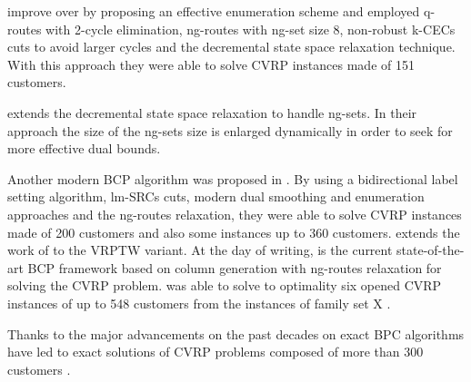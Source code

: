 \textcite{contardo2014} improve over \textcite{contardo2011}
by proposing an effective enumeration scheme and employed
q-routes with 2-cycle elimination, ng-routes with ng-set size 8,
non-robust k-CECs cuts to avoid larger cycles
and the decremental state space relaxation technique.
With this approach they were able to solve CVRP instances made of 151 customers.

\textcite{martinelli2014} extends the decremental state space relaxation
to handle ng-sets.
In their approach the size of the ng-sets size
is enlarged dynamically in order to seek for more effective dual bounds.


Another modern BCP algorithm was proposed in \textcite{pecin2017}.
By using a bidirectional label setting algorithm,
lm-SRCs cuts, modern dual smoothing and enumeration approaches
and the ng-routes relaxation, they were able to solve CVRP instances made of 200 customers
and also some instances up to 360 customers.
\textcite{pecin2017b} extends the work of \textcite{pecin2017} to the VRPTW variant.
At the day of writing, \textcite{pessoa2020a} is the current state-of-the-art
BCP framework based on column generation with ng-routes relaxation
for solving the CVRP problem.
\textcite{pessoa2020a} was able to solve to optimality six opened
CVRP instances of up to 548 customers from the instances of family set X \parencite{uchoa2017}.

Thanks to the major advancements on the past decades
on exact BPC algorithms
have led to exact solutions of CVRP problems composed of
more than 300 customers \parencite{costa2019}.

